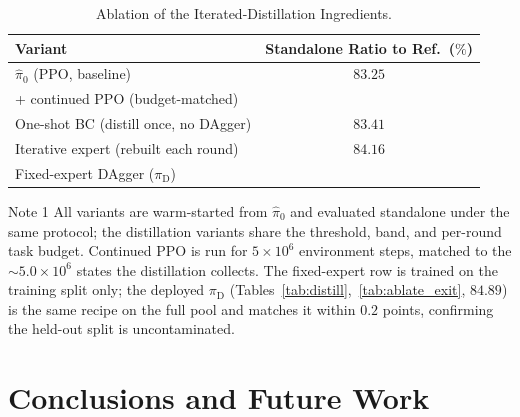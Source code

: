 \documentclass[journal, twoside]{IEEEtran}
\newcommand{\limebox}[1]{\setlength{\fboxsep}{0pt}{\colorbox{lime}{#1}}}
\newcommand{\pinkbox}[1]{\setlength{\fboxsep}{0pt}{\colorbox{yellow}{#1}}}
\begin{document}
\begin{table}[!htbp]
\centering

\caption{Ablation of the Iterated-Distillation Ingredients.}
\label{tab:ablate_ablation}
\begin{threeparttable}
\begin{tabular}{lc}
\toprule
Variant & \shortstack{Standalone\\ Ratio to Ref.\ ($\%$)} \\
\midrule
$\hat{\pi}_{0}$ (PPO, baseline)                      & $83.25$ \\
\;+ continued PPO (budget-matched)                   & \pinkbox{$82.58$} \\
One-shot BC (distill once, no DAgger)                & $83.41$ \\
Iterative expert (rebuilt each round)                & $84.16$ \\
Fixed-expert DAgger ($\pi_{\mathrm{D}}$)             & \limebox{$85.08$} \\
\bottomrule
\end{tabular}
\begin{tablenotes}
    \item[Note 1] All variants are warm-started from $\hat{\pi}_{0}$ and evaluated standalone under the same protocol; the distillation variants share the threshold, band, and per-round task budget. Continued PPO is run for $5{\times}10^{6}$ environment steps, matched to the $\sim\!5.0{\times}10^{6}$ states the distillation collects. The fixed-expert row is trained on the training split only; the deployed $\pi_{\mathrm{D}}$ (Tables~\ref{tab:distill},~\ref{tab:ablate_exit}, $84.89$) is the same recipe on the full pool and matches it within $0.2$ points, confirming the held-out split is uncontaminated.
\end{tablenotes}
\end{threeparttable}
\end{table}

\section{Conclusions and Future Work}
\label{sec:conclusion}
\end{document}

